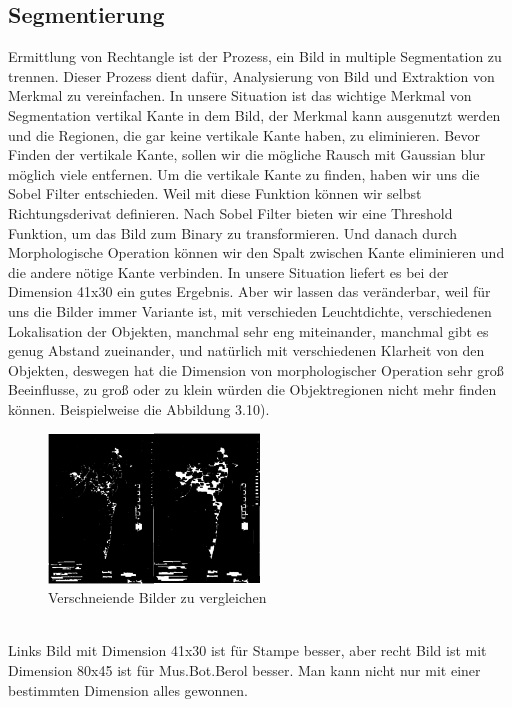 \documentclass[10pt,a4paper]{report}
\begin{document}
\subsection{Segmentierung}
Ermittlung von Rechtangle ist der Prozess, ein Bild in multiple Segmentation zu trennen. Dieser Prozess dient dafür, Analysierung von Bild und Extraktion von Merkmal zu vereinfachen.\cite{5} 
In unsere Situation ist das wichtige Merkmal von Segmentation vertikal Kante in dem Bild, der Merkmal kann ausgenutzt werden und die Regionen, die gar keine vertikale Kante haben, zu eliminieren. 
Bevor Finden der vertikale Kante, sollen wir die mögliche Rausch mit Gaussian blur möglich viele entfernen. Um die vertikale Kante zu finden, haben wir uns die Sobel Filter entschieden. Weil mit diese Funktion können wir selbst Richtungsderivat definieren. 
Nach Sobel Filter bieten wir eine Threshold Funktion, um das Bild zum Binary zu transformieren. Und danach durch Morphologische Operation können wir den Spalt zwischen Kante eliminieren und die andere nötige Kante verbinden. In unsere Situation liefert es bei der Dimension 41x30 ein gutes Ergebnis. Aber wir lassen das veränderbar, weil für uns die Bilder immer Variante ist, mit verschieden Leuchtdichte, verschiedenen Lokalisation der Objekten, manchmal sehr eng miteinander, manchmal gibt es genug Abstand zueinander, und natürlich mit verschiedenen Klarheit von den Objekten, deswegen hat die Dimension von morphologischer Operation sehr groß Beeinflusse, zu groß oder zu klein würden die Objektregionen nicht mehr finden können. Beispielweise die Abbildung 3.10).\\
\begin{figure}[htbp] 
	\centering
	\includegraphics[width=0.5\textwidth]{SVMPre.png}
	\caption{Verschneiende Bilder zu vergleichen}
	\label{fig:Bild 3.10}
\end{figure}\\
Links Bild mit Dimension 41x30 ist für Stampe besser, aber recht Bild ist mit Dimension 80x45 ist für Mus.Bot.Berol besser. Man kann nicht nur mit einer bestimmten Dimension alles gewonnen.
\end{document}
